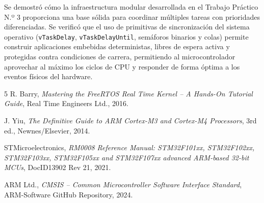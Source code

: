 \documentclass{plantilla}
\begin{document}
Se demostró cómo la infraestructura modular desarrollada en el Trabajo Práctico N.º 3 proporciona una base sólida para coordinar múltiples tareas con prioridades diferenciadas. Se verificó que el uso de primitivas de sincronización del sistema operativo (\texttt{vTaskDelay}, \texttt{vTaskDelayUntil}, semáforos binarios y colas) permite construir aplicaciones embebidas deterministas, libres de espera activa y protegidas contra condiciones de carrera, permitiendo al microcontrolador aprovechar al máximo los ciclos de CPU y responder de forma óptima a los eventos físicos del hardware.

\begin{thebibliography}{5}
R. Barry, \emph{Mastering the FreeRTOS Real Time Kernel -- A Hands-On Tutorial Guide}, Real Time Engineers Ltd., 2016.

J. Yiu, \emph{The Definitive Guide to ARM Cortex-M3 and Cortex-M4 Processors}, 3rd ed., Newnes/Elsevier, 2014.

STMicroelectronics, \emph{RM0008 Reference Manual: STM32F101xx, STM32F102xx, STM32F103xx, STM32F105xx and STM32F107xx advanced ARM-based 32-bit MCUs}, DocID13902 Rev 21, 2021.

ARM Ltd., \emph{CMSIS -- Common Microcontroller Software Interface Standard}, ARM-Software GitHub Repository, 2024.
\end{thebibliography}
\end{document}

